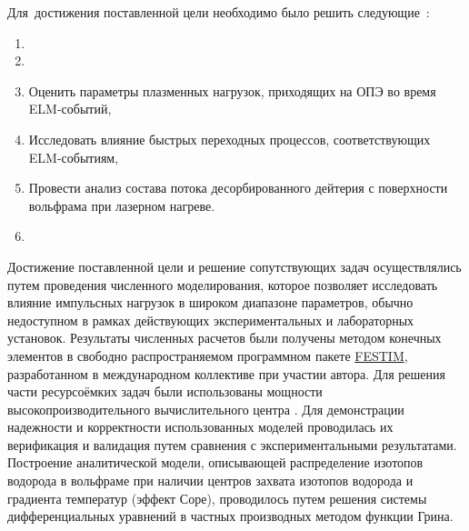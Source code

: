 Для~достижения поставленной цели необходимо было решить следующие~{\tasks}:
\begin{enumerate}[beginpenalty=10000] %
    \item {}
    \item {}
    \item Оценить параметры плазменных нагрузок, приходящих на ОПЭ во время ELM-событий, 
    \item Исследовать влияние быстрых переходных процессов, соответствующих ELM-событиям, 
    \item Провести анализ состава потока десорбированного дейтерия с поверхности вольфрама при лазерном нагреве.
    \item {}
\end{enumerate}

{\methods} Достижение поставленной цели и решение сопутствующих задач осуществлялись путем проведения численного моделирования, которое позволяет исследовать влияние импульсных нагрузок в широком диапазоне параметров, обычно недоступном в рамках действующих экспериментальных и лабораторных установок. Результаты численных расчетов были получены методом конечных элементов в свободно распространяемом программном пакете \href{https://github.com/festim-dev/FESTIM}{FESTIM}, разработанном в международном коллективе при участии автора. Для решения части ресурсоёмких задач были использованы мощности высокопроизводительного вычислительного центра \thesisOrganizationShort. Для демонстрации надежности и корректности использованных моделей проводилась их верификация и валидация путем сравнения с экспериментальными результатами. Построение аналитической модели, описывающей распределение изотопов водорода в вольфраме при наличии центров захвата изотопов водорода и градиента температур (эффект Соре), проводилось путем решения системы дифференциальных уравнений в частных производных методом функции Грина.

